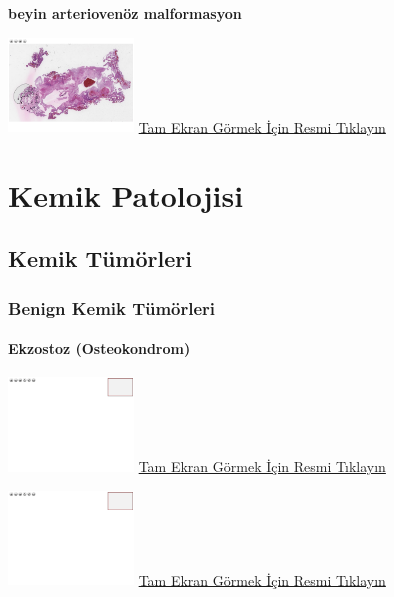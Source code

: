 \documentclass[
  letterpaper,
  DIV=11,
  numbers=noendperiod]{scrreprt}
\begin{document}
\textbf{beyin arteriovenöz malformasyon}

\href{https://images.patolojiatlasi.com/brain-arteriovenous-malformation/HE.html}{\includegraphics[width=0.25\textwidth,height=\textheight]{./screenshots/brain-arteriovenous-malformation_screenshot.png}}
\href{https://images.patolojiatlasi.com/brain-arteriovenous-malformation/HE.html}{Tam
Ekran Görmek İçin Resmi Tıklayın}

\part{Kemik Patolojisi}

\hypertarget{sec-kemik-tumorleri}{%
\chapter{Kemik Tümörleri}\label{sec-kemik-tumorleri}}

\hypertarget{sec-benign-kemik-tumorleri}{%
\section{Benign Kemik Tümörleri}\label{sec-benign-kemik-tumorleri}}

\hypertarget{sec-ekzostoz}{%
\subsection{Ekzostoz (Osteokondrom)}\label{sec-ekzostoz}}

\href{https://images.patolojiatlasi.com/template/HE.html}{\includegraphics[width=0.25\textwidth,height=\textheight]{./screenshots/template_screenshot.png}}
\href{https://images.patolojiatlasi.com/exostosis/oc.html}{Tam Ekran
Görmek İçin Resmi Tıklayın}

\href{https://images.patolojiatlasi.com/template/HE.html}{\includegraphics[width=0.25\textwidth,height=\textheight]{./screenshots/template_screenshot.png}}
\href{https://images.patolojiatlasi.com/exostosis/oc001.html}{Tam Ekran
Görmek İçin Resmi Tıklayın}
\end{document}
